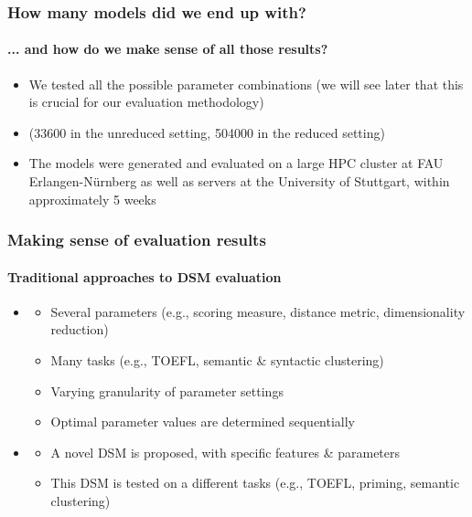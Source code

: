\documentclass[t]{beamer} %
\begin{document}
\begin{frame}
  \frametitle{How many models did we end up with?}
  \framesubtitle{... and how do we make sense of all those results?}   

  \begin{itemize}
  \item We tested all the possible parameter combinations (we will see later that this is crucial for our evaluation methodology)
  \item {} (33600 in the unreduced setting, 504000 in the reduced setting)
  \item The models were generated and evaluated on a large HPC cluster at FAU Erlangen-Nürnberg as well as servers at the University of Stuttgart, within approximately 5 weeks

  \end{itemize}
\end{frame}



\begin{frame}
  \frametitle{Making sense of evaluation results}  
  \framesubtitle{Traditional approaches to DSM evaluation}

  \begin{itemize}
  \item {} \citep{Bullinaria:Levy:07,Bullinaria:Levy:12,Kiela:Clark:14,Polajnar:Clark:14}
    \begin{itemize}
    \item Several parameters (e.g., scoring measure, distance metric, dimensionality reduction) 
    \item Many tasks (e.g., TOEFL, semantic \& syntactic clustering)
    \item Varying granularity of parameter settings
    \item Optimal parameter values are determined sequentially
    \end{itemize}

  \item {} \citep{Pado:Lapata:07,Baroni:Lenci:10}
    \begin{itemize}
    \item A novel DSM is proposed, with specific features \& parameters
    \item This DSM is tested on a different tasks (e.g., TOEFL, priming, semantic clustering)
    \end{itemize}
  \end{itemize}
\end{frame}
\end{document}
